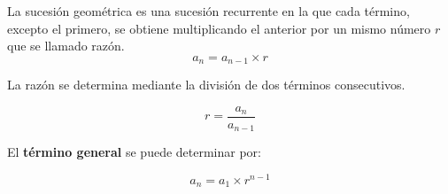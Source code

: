 La sucesión geométrica es una sucesión recurrente en la que cada término, excepto el primero, se obtiene multiplicando el anterior por un mismo número $r$ que se llamado razón.
$$a_n= a_{n-1}\times r$$

La razón se determina mediante la división de dos términos consecutivos.

$$r=\frac{a_n}{a_{n-1}}$$

El \textbf{término general} se puede determinar por:

$$a_n=a_1\times r^{n-1}$$